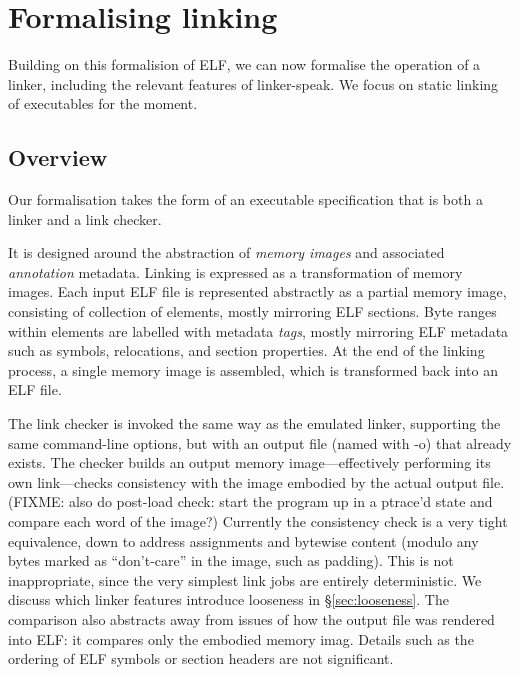 \section{Formalising linking}

Building on this formalision of ELF, we can now formalise the operation of a linker,
including the relevant features of linker-speak.
We focus on static linking of executables for the moment.

\subsection{Overview}

Our formalisation takes the form of an executable specification that 
is both a linker and a link checker.

It is designed around the abstraction of \emph{memory images} and associated \emph{annotation} metadata.
Linking is expressed as a transformation of memory images.
Each input ELF file is represented abstractly as a partial memory image, consisting of 
collection of elements, mostly mirroring ELF sections.
Byte ranges within elements are labelled with metadata \emph{tags}, 
mostly mirroring ELF metadata such as symbols, relocations, and section properties.
At the end of the linking process, a single memory image is assembled,
which is transformed back into an ELF file.

The link checker is invoked the same way as the emulated linker, supporting the same command-line options,
but with an output file (named with \textsf{-o}) that already exists.
The checker builds an output memory image---effectively performing its own link---checks consistency with the image
embodied by the actual output file.
(FIXME: also do post-load check: start the program up in a ptrace'd state 
and compare each word of the image?)
Currently the consistency check is a very tight equivalence, down to address assignments and bytewise content
(modulo any bytes marked as ``don't-care'' in the image, such as padding).
This is not inappropriate, since the very simplest link jobs are entirely deterministic.
We discuss which linker features introduce looseness in \S\ref{sec:looseness}.
The comparison also abstracts away from issues of how the output file was rendered into ELF: 
it compares only the embodied memory imag. 
Details such as the ordering of ELF symbols or section headers are not significant.

